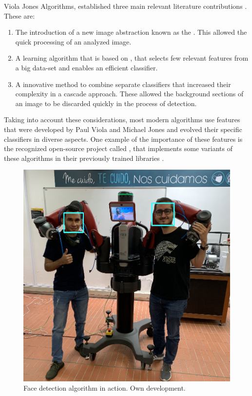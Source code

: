 \documentclass[11pt]{report} %
\begin{document}
Viola Jones Algorithms, established three main relevant literature contributions \citep{cite_viola_jones_face_detection_algorithm}. These are:\\

\begin{enumerate}
    \item The introduction of a new image abstraction known as the . This allowed the quick processing of an analyzed image.
    \item A learning algorithm that is based on , that selects few relevant features from a big data-set and enables an efficient classifier.
    \item A innovative method to combine separate classifiers that increased their complexity in a cascade approach. These allowed the background sections of an image to be discarded quickly in the process of detection.\\
\end{enumerate}

Taking into account these considerations, most modern algorithms use features that were developed by Paul Viola and Michael Jones and evolved their specific classifiers in diverse aspects. One example of the importance of these features is the recognized open-source project called , that implements some variants of these algorithms in their previously trained  libraries \citep{cite_opencv_classifier_face_detection_general}.\\



\begin{figure}[H]
    \centering
    \includegraphics[width=0.8\linewidth]{assets/imgs/reference_framework/face_detection_example_us.png}
    \caption{Face detection algorithm in action. Own development.}
    \label{fig_face_detection_us_with_baxter}
\end{figure}
\end{document}
